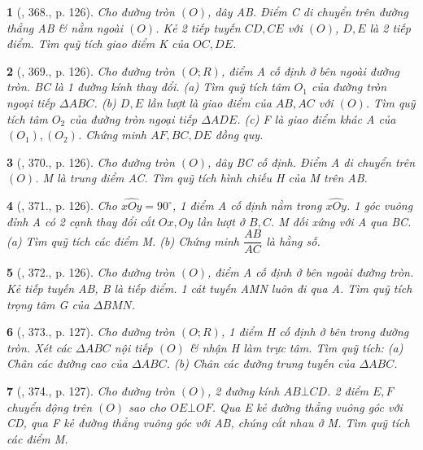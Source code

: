 \documentclass{article}
\newtheorem{baitoan}{}
\begin{document}
\begin{baitoan}[\cite{Binh_Toan_9_tap_2}, 368., p. 126]
	Cho đường tròn $(O)$, dây AB. Điểm C di chuyển trên đường thẳng AB \& nằm ngoài $(O)$. Kẻ 2 tiếp tuyến $CD,CE$ với $(O)$, $D,E$ là 2 tiếp điểm. Tìm quỹ tích giao điểm K của $OC,DE$.
\end{baitoan}

\begin{baitoan}[\cite{Binh_Toan_9_tap_2}, 369., p. 126]
	Cho đường tròn $(O;R)$, điểm A cố định ở bên ngoài đường tròn. BC là 1 đường kính thay đổi. (a) Tìm quỹ tích tâm $O_1$ của đường tròn ngoại tiếp $\Delta ABC$. (b) $D,E$ lần lượt là giao điểm của $AB,AC$ với $(O)$. Tìm quỹ tích tâm $O_2$ của đường tròn ngoại tiếp $\Delta ADE$. (c) F là giao điểm khác A của $(O_1),(O_2)$. Chứng minh $AF,BC,DE$ đồng quy.
\end{baitoan}

\begin{baitoan}[\cite{Binh_Toan_9_tap_2}, 370., p. 126]
	Cho đường tròn $(O)$, dây BC cố định. Điểm A di chuyển trên $(O)$. M là trung điểm AC. Tìm quỹ tích hình chiếu H của M trên AB.
\end{baitoan}

\begin{baitoan}[\cite{Binh_Toan_9_tap_2}, 371., p. 126]
	Cho $\widehat{xOy} = 90^\circ$, 1 điểm A cố định nằm trong $\widehat{xOy}$. 1 góc vuông đỉnh A có 2 cạnh thay đổi cắt $Ox,Oy$ lần lượt ở $B,C$. M đối xứng với A qua BC. (a) Tìm quỹ tích các điểm M. (b) Chứng minh $\dfrac{AB}{AC}$ là hằng số.
\end{baitoan}

\begin{baitoan}[\cite{Binh_Toan_9_tap_2}, 372., p. 126]
	Cho đường tròn $(O)$, điểm A cố định ở bên ngoài đường tròn. Kẻ tiếp tuyến AB, B là tiếp điểm. 1 cát tuyến AMN luôn đi qua A. Tìm quỹ tích trọng tâm G của $\Delta BMN$.
\end{baitoan}

\begin{baitoan}[\cite{Binh_Toan_9_tap_2}, 373., p. 127]
	Cho đường tròn $(O;R)$, 1 điểm H cố định ở bên trong đường tròn. Xét các $\Delta ABC$ nội tiếp $(O)$ \& nhận H làm trực tâm. Tìm quỹ tích: (a) Chân các đường cao của $\Delta ABC$. (b) Chân các đường trung tuyến của $\Delta ABC$.
\end{baitoan}

\begin{baitoan}[\cite{Binh_Toan_9_tap_2}, 374., p. 127]
	Cho đường tròn $(O)$, 2 đường kính $AB\bot CD$. 2 điểm $E,F$ chuyển động trên $(O)$ sao cho $OE\bot OF$. Qua E kẻ đường thẳng vuông góc với CD, qua F kẻ đường thẳng vuông góc với AB, chúng cắt nhau ở M. Tìm quỹ tích các điểm M.
\end{baitoan}
\end{document}
